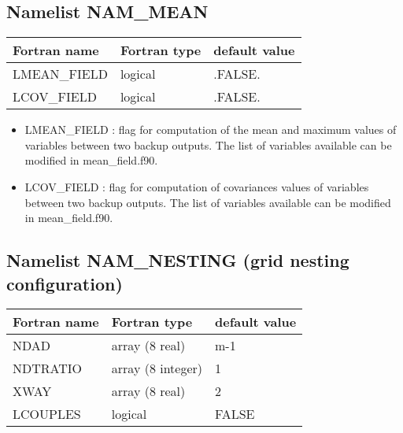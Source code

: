 \subsection{Namelist NAM\_MEAN}
\begin{center}
\begin{tabular} {|l|l|l|}
\hline
Fortran name & Fortran type & default value \\
\hline
LMEAN\_FIELD  &  logical &  .FALSE. \\
LCOV\_FIELD  &  logical &  .FALSE. \\
\hline
\end{tabular}
\end{center}
\begin{itemize}
 \item LMEAN\_FIELD : flag for computation of the mean and maximum values of variables between two backup outputs. The list of variables available can be modified in mean\_field.f90.
 \item LCOV\_FIELD : flag for computation of covariances values of variables between two backup outputs. The list of variables available can be modified in mean\_field.f90.


\end{itemize}

\subsection{Namelist NAM\_NESTING (grid nesting configuration)}

\begin{center}
\begin{tabular} {|l|l|l|}
\hline
Fortran name & Fortran type & default value \\
\hline
NDAD  &  array (8 real) &  m-1   \\
NDTRATIO & array (8 integer) & 1 \\
XWAY & array (8 real) & 2 \\
LCOUPLES & logical & FALSE \\
\hline
\end{tabular}
\end{center}

